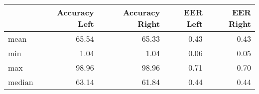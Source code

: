 \begin{tabular}{lrrrr}
\toprule
{} &  Accuracy Left &  Accuracy Right &  EER Left &  EER Right \\
\midrule
mean   &          65.54 &           65.33 &      0.43 &       0.43 \\
min    &           1.04 &            1.04 &      0.06 &       0.05 \\
max    &          98.96 &           98.96 &      0.71 &       0.70 \\
median &          63.14 &           61.84 &      0.44 &       0.44 \\
\bottomrule
\end{tabular}
